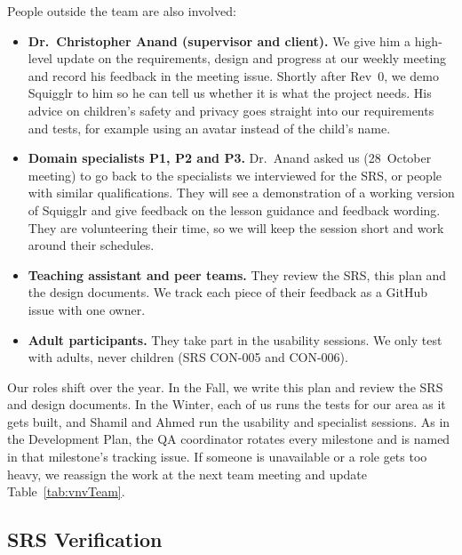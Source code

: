 \documentclass[12pt, titlepage]{article}
\begin{document}
People outside the team are also involved:

\begin{itemize}
  \item \textbf{Dr.\ Christopher Anand (supervisor and client).} We give him
    a high-level update on the requirements, design and progress at our
    weekly meeting and record his feedback in the meeting issue. Shortly
    after Rev~0, we demo Squigglr to him so he can tell us whether it is
    what the project needs. His advice on children's safety and privacy
    goes straight into our requirements and tests, for example using an
    avatar instead of the child's name.
  \item \textbf{Domain specialists P1, P2 and P3.} Dr.\ Anand asked us
    (28~October meeting) to go back to the specialists we interviewed for the
    SRS, or people with similar qualifications. They will see a demonstration of a working version of Squigglr and give
    feedback on the lesson guidance and feedback wording. They are
    volunteering their time, so we will keep the session short and work
    around their schedules.
  \item \textbf{Teaching assistant and peer teams.} They review the SRS,
    this plan and the design documents. We track each piece of their
    feedback as a GitHub issue with one owner.
  \item \textbf{Adult participants.} They take part in the usability
    sessions. We only test with adults, never children (SRS CON-005 and CON-006).
\end{itemize}

Our roles shift over the year. In the Fall, we write this plan and review
the SRS and design documents. In the Winter, each of us runs the tests for
our area as it gets built, and Shamil and Ahmed run the usability and
specialist sessions. As in the Development Plan, the QA coordinator
rotates every milestone and is named in that milestone's tracking issue. If
someone is unavailable or a role gets too heavy, we reassign the work at the
next team meeting and update Table~\ref{tab:vnvTeam}.

\subsection{SRS Verification}
\label{sec:srs-verification}
\end{document}
